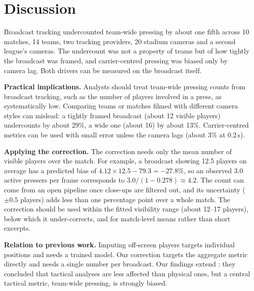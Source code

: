 \documentclass[]{interact}
\begin{document}
\section{Discussion}

Broadcast tracking undercounted team-wide pressing by about one fifth across 10 matches, 14 teams, two tracking
providers, 20 stadium cameras and a second league's cameras. The undercount was not a property of teams but of how
tightly the broadcast was framed, and carrier-centred pressing was biased only by camera lag. Both drivers can be
measured on the broadcast itself.

\textbf{Practical implications.} Analysts should treat team-wide pressing counts from broadcast tracking, such as the
number of players involved in a press, as systematically low. Comparing teams or matches filmed with different camera
styles can mislead: a tightly framed broadcast (about 12 visible players) undercounts by about 29\%, a wide one (about
16) by about 13\%. Carrier-centred metrics can be used with small error unless the camera lags (about 3\% at 0.2\,s).

\textbf{Applying the correction.} The correction needs only the mean number of visible players over the match. For
example, a broadcast showing 12.5 players on average has a predicted bias of $4.12 \times 12.5 - 79.3 = -27.8\%$, so an
observed 3.0 active pressers per frame corresponds to $3.0 / (1 - 0.278) \approx 4.2$. The count can come from an open
pipeline once close-ups are filtered out, and its uncertainty ($\pm 0.5$ players) adds less than one percentage point
over a whole match. The correction should be used within the fitted visibility range (about 12--17 players), below
which it under-corrects, and for match-level means rather than short excerpts.

\textbf{Relation to previous work.} Imputing off-screen players \citep{omidshafiei2022graphimputer,offscreen2026}
targets individual positions and needs a trained model. Our correction targets the aggregate metric directly and
needs a single number per broadcast. Our findings extend \citet{smf2025broadcast}: they concluded that tactical
analyses are less affected than physical ones, but a central tactical metric, team-wide pressing, is strongly
biased.
\end{document}
